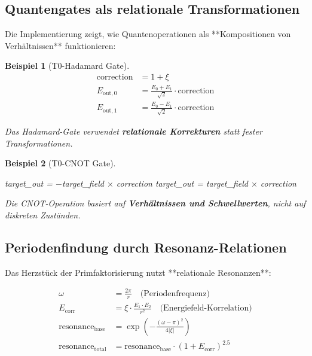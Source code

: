 \documentclass[11pt,a4paper]{article}
\newtheorem{example}{Beispiel}[section]
\begin{document}
	\subsection{Quantengates als relationale Transformationen}
	
	Die Implementierung zeigt, wie Quantenoperationen als **Kompositionen von Verhältnissen** funktionieren:
	
	\begin{example}[T0-Hadamard Gate]
		\begin{align}
			\text{correction} &= 1 + \xi \\
			E_{\text{out},0} &= \frac{E_0 + E_1}{\sqrt{2}} \cdot \text{correction} \\
			E_{\text{out},1} &= \frac{E_0 - E_1}{\sqrt{2}} \cdot \text{correction}
		\end{align}
		
		Das Hadamard-Gate verwendet \textbf{relationale Korrekturen} statt fester Transformationen.
	\end{example}
	
	\begin{example}[T0-CNOT Gate]
		\begin{algorithmic}[1]
			\STATE target\_out = $-$target\_field $\times$ correction
			\ELSE
			\STATE target\_out = target\_field $\times$ correction
			\ENDIF
		\end{algorithmic}
		
		Die CNOT-Operation basiert auf \textbf{Verhältnissen und Schwellwerten}, nicht auf diskreten Zuständen.
	\end{example}
	
	\subsection{Periodenfindung durch Resonanz-Relationen}
	
	Das Herzstück der Primfaktorisierung nutzt **relationale Resonanzen**:
	
	\begin{align}
		\omega &= \frac{2\pi}{r} \quad \text{(Periodenfrequenz)} \\
		E_{\text{corr}} &= \xi \cdot \frac{E_1 \cdot E_2}{r^2} \quad \text{(Energiefeld-Korrelation)} \\
		\text{resonance}_{\text{base}} &= \exp\left(-\frac{(\omega - \pi)^2}{4|\xi|}\right) \\
		\text{resonance}_{\text{total}} &= \text{resonance}_{\text{base}} \cdot (1 + E_{\text{corr}})^{2.5}
	\end{align}
	
\end{document}
